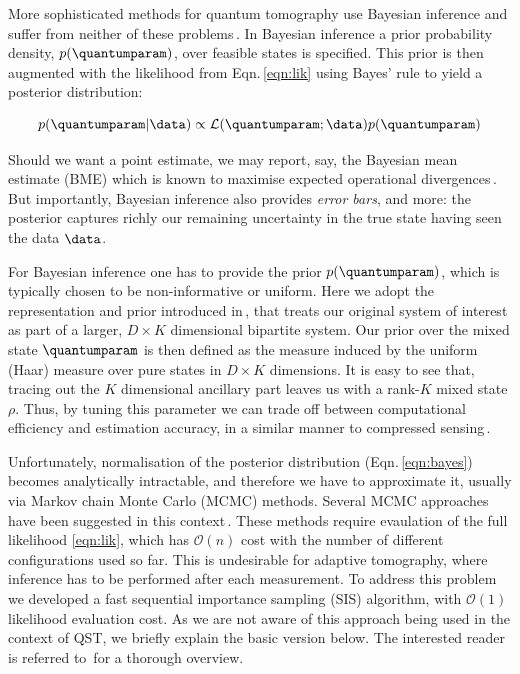 More sophisticated methods for quantum tomography use Bayesian inference and suffer from neither of these problems\,\cite[][and refs.]{BayesianTomography}. In Bayesian inference a prior probability density, $p(\quantumparam)$, over feasible states is specified. This prior is then augmented with the likelihood from Eqn.\,\eqref{eqn:lik} using Bayes' rule to yield a posterior distribution:

\begin{equation}
\label{eqn:bayes}
p(\quantumparam\vert\data)\propto \mathcal{L}(\quantumparam;\data)p(\quantumparam)
\end{equation}

Should we want a point estimate, we may report, say, the Bayesian mean estimate (BME) which is known to maximise expected operational divergences\,\cite{BayesianTomography,BayesianOptimality}. But importantly, Bayesian inference also provides \emph{error bars}, and more: the posterior captures richly our remaining uncertainty in the true state having seen the data $\data$. 

For Bayesian inference one has to provide the prior $p(\quantumparam)$, which is typically chosen to be non-informative or uniform. Here we adopt the representation and prior introduced in\,\cite{BayesianTomography}, that treats our original system of interest as part of a larger, $D\times K$ dimensional bipartite system. Our prior over the mixed state $\quantumparam$ is then defined as the measure induced by the uniform (Haar) measure over pure states in $D\times K$ dimensions. It is easy to see that, tracing out the $K$ dimensional ancillary part leaves us with a rank-$K$ mixed state $\rho$. Thus, by tuning this parameter we can trade off between computational efficiency and estimation accuracy, in a similar manner to compressed sensing\,\cite{CompressedSensing}.

Unfortunately, normalisation of the posterior distribution (Eqn.\,\eqref{eqn:bayes}) becomes analytically intractable, and therefore we have to approximate it, usually via Markov chain Monte Carlo (MCMC) methods. Several MCMC approaches have been suggested in this context\,\cite[][and refs.\ therein]{BayesianTomography}. These methods require evaulation of the full likelihood \eqref{eqn:lik}, which has $\mathcal{O}(n)$ cost with the number of different configurations used so far. This is undesirable for adaptive tomography, where inference has to be performed after each measurement. To address this problem we developed a fast sequential importance sampling (SIS) algorithm, with $\mathcal{O}(1)$ likelihood evaluation cost. As we are not aware of this approach being used in the context of QST, we briefly explain the basic version below. The interested reader is referred to\,\cite{SMCBook} for a thorough overview.

